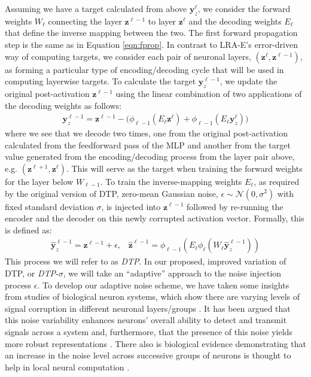 \documentclass[letterpaper]{article} %
\begin{document}
Assuming we have a target calculated from above $\mathbf{y}^{\ell}_z$, we consider the forward weights $W_\ell$ connecting the layer $\mathbf{z}^{\ell-1}$ to layer $\mathbf{z}^{\ell}$ and the decoding weights $E_\ell$ that define the inverse mapping between the two. The first forward propagation step is the same as in Equation \ref{eqn:fprop}.
In contrast to LRA-E's error-driven way of computing targets, we consider each pair of neuronal layers, $(\mathbf{z}^{\ell}, \mathbf{z}^{\ell-1})$, as forming a particular type of encoding/decoding cycle that will be used in computing layerwise targets. To calculate the target $\mathbf{y}^{\ell-1}_z$, we update the original post-activation $\mathbf{z}^{\ell-1}$ using the linear combination of two applications of the decoding weights as follows:
\begin{align}
	\mathbf{y}^{\ell-1}_z = \mathbf{z}^{\ell-1} - \big ( \phi_{\ell-1}( E_\ell \mathbf{z}^\ell ) + \phi_{\ell-1}( E_\ell \mathbf{y}^\ell_z ) \big )
\end{align}
where we see that we decode two times, one from the original post-activation calculated from the feedforward pass of the MLP and another from the target value generated from the encoding/decoding process from the layer pair above, e.g. $(\mathbf{z}^{\ell+1}, \mathbf{z}^{\ell})$. This will serve as the target when training the forward weights for the layer below $W_{\ell-1}$. To train the inverse-mapping weights $E_{\ell}$, as required by the original version of DTP, zero-mean Gaussian noise, $\epsilon \sim \mathcal{N}(0,\sigma^2)$ with fixed standard deviation $\sigma$, is injected into $\mathbf{z}^{\ell-1}$ followed by re-running the encoder and the decoder on this newly corrupted activation vector. Formally, this is defined as:
\begin{align}
	\mathbf{\widehat{y}}^{\ell-1}_z = \mathbf{z}^{\ell-1} + \epsilon \mbox{,} \quad \mathbf{\widehat{z}}^{\ell-1} = \phi_{\ell-1}(E_{\ell}\phi_{\ell}(W_\ell \mathbf{\widehat{y}}^{\ell-1}_z))
\end{align}
This process we will refer to as \emph{DTP}. 
In our proposed, improved variation of DTP, or \emph{DTP}-$\sigma$, we will take an ``adaptive'' approach to the noise injection process $\epsilon$. To develop our adaptive noise scheme, we have taken some insights from studies of biological neuron systems, which show there are varying levels of signal corruption in different neuronal layers/groups \cite{adrian,TOMKO1974405,TOLHURST1983775,pmid9570816}. It has been argued that this noise variability enhances neurons' overall ability to detect and transmit signals across a system \cite{shu,Kruglikov,pmid9570816} and, furthermore, that the presence of this noise yields more robust representations \cite{Cordo,pmid9570816,faizal}. There also is biological evidence demonstrating that an increase in the noise level across successive groups of neurons is thought to help in local neural computation \cite{pmid9570816,Sarpeshkar,Laughlin}.
\end{document}
